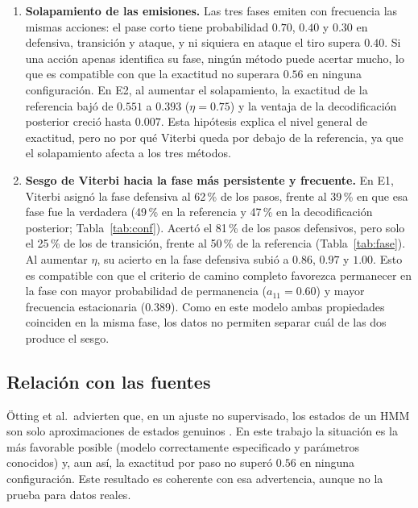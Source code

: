 \documentclass[11pt,a4paper]{article}
\begin{document}
\begin{enumerate}[label=\textbf{(\alph*)}, leftmargin=*]
  \item \textbf{Solapamiento de las emisiones.} Las tres fases emiten con
  frecuencia las mismas acciones: el pase corto tiene probabilidad
  $0.70$, $0.40$ y $0.30$ en defensiva, transición y ataque, y ni siquiera
  en ataque el tiro supera $0.40$. Si una acción apenas identifica su fase,
  ningún método puede acertar mucho, lo que es compatible con que la
  exactitud no superara $0.56$ en ninguna configuración. En E2, al aumentar
  el solapamiento, la exactitud de la referencia bajó de $0.551$ a $0.393$
  ($\eta=0.75$) y la ventaja de la decodificación posterior creció hasta
  $0.007$. Esta hipótesis explica el nivel general de exactitud, pero no por
  qué Viterbi queda por debajo de la referencia, ya que el solapamiento
  afecta a los tres métodos.

  \item \textbf{Sesgo de Viterbi hacia la fase más persistente y frecuente.}
  En E1, Viterbi asignó la fase defensiva al 62\,\% de los pasos, frente al
  39\,\% en que esa fase fue la verdadera (49\,\% en la referencia y
  47\,\% en la decodificación posterior; Tabla~\ref{tab:conf}). Acertó el
  81\,\% de los pasos defensivos, pero solo el 25\,\% de los de
  transición, frente al 50\,\% de la referencia (Tabla~\ref{tab:fase}). Al
  aumentar $\eta$, su acierto en la fase defensiva subió a $0.86$, $0.97$ y
  $1.00$. Esto es compatible con que el criterio de camino completo favorezca
  permanecer en la fase con mayor probabilidad de permanencia ($a_{11}=0.60$)
  y mayor frecuencia estacionaria ($0.389$). Como en este modelo ambas
  propiedades coinciden en la misma fase, los datos no permiten separar cuál
  de las dos produce el sesgo.
\end{enumerate}

\subsection{Relación con las fuentes}

Ötting et al.\ advierten que, en un ajuste no supervisado, los estados de un
HMM son solo aproximaciones de estados genuinos \cite[p.~23]{otting2023}. En
este trabajo la situación es la más favorable posible (modelo correctamente
especificado y parámetros conocidos) y, aun así, la exactitud por paso no
superó $0.56$ en ninguna configuración. Este resultado es coherente con esa
advertencia, aunque no la prueba para datos reales.
\end{document}
